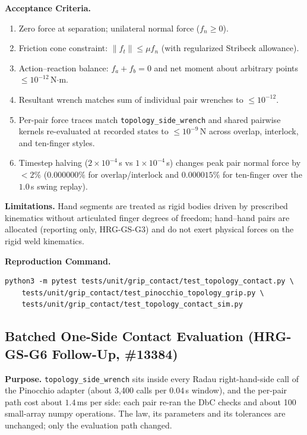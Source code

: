 \documentclass[11pt,a4paper]{article}
\begin{document}
\textbf{Acceptance Criteria.}
\begin{enumerate}[leftmargin=*,noitemsep]
\item Zero force at separation; unilateral normal force ($f_n \ge 0$).
\item Friction cone constraint: $\|f_t\| \le \mu f_n$ (with regularized Stribeck allowance).
\item Action--reaction balance: $f_a + f_b = 0$ and net moment about arbitrary points $\le 10^{-12}$\,N$\cdot$m.
\item Resultant wrench matches sum of individual pair wrenches to $\le 10^{-12}$.
\item Per-pair force traces match \texttt{topology\_side\_wrench} and shared pairwise kernels re-evaluated at recorded states to $\le 10^{-9}$\,N across overlap, interlock, and ten-finger styles.
\item Timestep halving ($2 \times 10^{-4}$\,s vs $1 \times 10^{-4}$\,s) changes peak pair normal force by $< 2\%$ ($0.000000\%$ for overlap/interlock and $0.000015\%$ for ten-finger over the $1.0$\,s swing replay).
\end{enumerate}

\textbf{Limitations.} Hand segments are treated as rigid bodies driven by prescribed kinematics without articulated finger degrees of freedom;
hand--hand pairs are allocated (reporting only, HRG-GS-G3) and do not exert physical forces on the rigid weld kinematics.

\textbf{Reproduction Command.}
\begin{verbatim}
python3 -m pytest tests/unit/grip_contact/test_topology_contact.py \
    tests/unit/grip_contact/test_pinocchio_topology_grip.py \
    tests/unit/grip_contact/test_topology_contact_sim.py
\end{verbatim}

\subsection{Batched One-Side Contact Evaluation (HRG-GS-G6 Follow-Up, \#13384)}
\textbf{Purpose.} \texttt{topology\_side\_wrench} sits inside every Radau right-hand-side call of the Pinocchio adapter
(about 3{,}400 calls per $0.04$\,s window), and the per-pair path cost about $1.4$\,ms per side: each pair re-ran the DbC
checks and about 100 small-array numpy operations. The law, its parameters and its tolerances are unchanged; only the
evaluation path changed.
\end{document}
